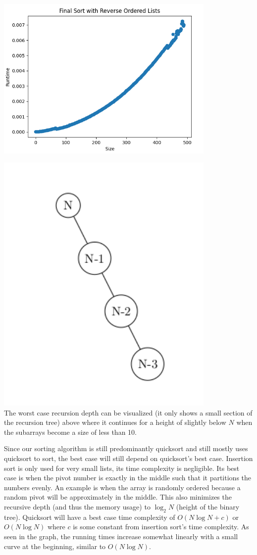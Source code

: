 \documentclass{article}
\begin{document}
\includegraphics[width=0.8\textwidth]{finalSortReverseOrderedLists}

\includegraphics[width=0.8\textwidth]{worstCase}\\
The worst case recursion depth can be visualized (it only shows a small section of the recursion tree) above where it continues for a height of slightly below $N$ when the subarrays become a size of less than 10.

Since our sorting algorithm is still predominantly quicksort and still mostly uses quicksort to sort, the best case will still depend on quicksort’s best case. Insertion sort is only used for very small lists, its time complexity is negligible. Its best case is when the pivot number is exactly in the middle such that it partitions the numbers evenly. An example is when the array is randomly ordered because a random pivot will be approximately in the middle. This also minimizes the recursive depth (and thus the memory usage) to $\log_2 N$ (height of the binary tree). Quicksort will have a best case time complexity of $O(N\log N + c)$ or $O(N\log N)$ where $c$ is some constant from insertion sort’s time complexity. As seen in the graph, the running times increase somewhat linearly with a small curve at the beginning, similar to $O(N\log N)$.
\end{document}
